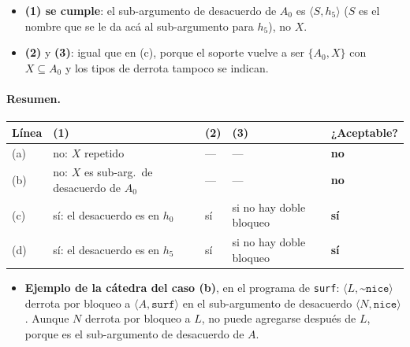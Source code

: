 \documentclass[11pt,a4paper]{article}
\newcommand{\nf}{\textasciitilde}                 %
\begin{document}
\begin{center}
\end{center}

\begin{itemize}
  \item \textbf{(1) se cumple}: el sub-argumento de desacuerdo de $A_0$ es $\langle S, h_5\rangle$ ($S$ es el nombre que se le da acá al sub-argumento para $h_5$), no $X$.
  \item \textbf{(2)} y \textbf{(3)}: igual que en (c), porque el soporte vuelve a ser $\{A_0, X\}$ con $X \subseteq A_0$ y los tipos de derrota tampoco se indican.
\end{itemize}

\paragraph{Resumen.}
\begin{center}
\small
\begin{tabularx}{\linewidth}{@{}l >{\raggedright\arraybackslash}X l l l@{}}
\toprule
\textbf{Línea} & \textbf{(1)} & \textbf{(2)} & \textbf{(3)} & \textbf{¿Aceptable?} \\
\midrule
(a) & no: $X$ repetido & --- & --- & \textbf{no} \\
(b) & no: $X$ es sub-arg.\ de desacuerdo de $A_0$ & --- & --- & \textbf{no} \\
(c) & sí: el desacuerdo es en $h_0$ & sí & si no hay doble bloqueo & \textbf{sí} \\
(d) & sí: el desacuerdo es en $h_5$ & sí & si no hay doble bloqueo & \textbf{sí} \\
\bottomrule
\end{tabularx}
\end{center}

\begin{extras}
\begin{itemize}
  \item \textbf{Ejemplo de la cátedra del caso (b)}, en el programa de \texttt{surf}: $\langle L, \texttt{\nf nice}\rangle$ derrota por bloqueo a $\langle A, \texttt{surf}\rangle$ en el sub-argumento de desacuerdo $\langle N, \texttt{nice}\rangle$. Aunque $N$ derrota por bloqueo a $L$, no puede agregarse después de $L$, porque es el sub-argumento de desacuerdo de $A$.
\end{itemize}
\end{extras}
\end{document}
